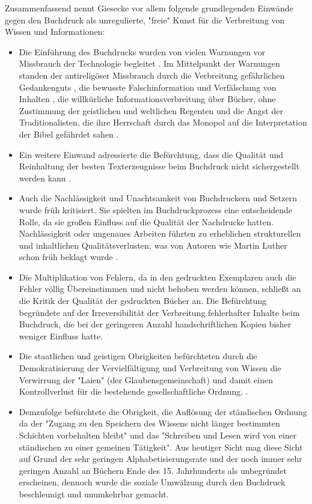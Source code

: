 Zusammenfassend nennt Giesecke vor allem folgende grundlegenden Einwände gegen den Buchdruck als unregulierte, "freie" Kunst \cite{giesecke_1991_buchdruck} für die Verbreitung von Wissen und Informationen:
\begin{itemize}
\item Die Einführung des Buchdrucks wurden von vielen Warnungen vor Missbrauch der Technologie begleitet \cite{lange2008medienwettbewerb}. Im Mittelpunkt der Warnungen standen der antireligöser Missbrauch durch die Verbreitung gefährlichen Gedankenguts \cite{kruse2003multimedia}, die bewusste Falschinformation und Verfälschung von Inhalten \cite{sprachgeschichte_1998_besch}, die willkürliche Informationsverbreitung über Bücher, ohne Zustimmung der geistlichen und weltlichen Regenten \cite{rother_2002_siebenbuergen} und die Angst der Traditionalisten, die ihre Herrschaft durch das Monopol auf die Interpretation der Bibel gefährdet sahen \cite{lange2008medienwettbewerb}.
\item Ein weitere Einwand adressierte die Befürchtung, dass die Qualität und Reinhaltung der besten Texterzeugnisse beim Buchdruck nicht sichergestellt werden kann \cite{giesecke_1991_buchdruck}.
\item Auch die Nachlässigkeit und Unachtsamkeit von Buchdruckern und Setzern wurde früh kritisiert. Sie spielten im Buchdruckprozess eine entscheidende Rolle, da sie großen Einfluss auf die Qualität der Nachdrucke hatten. Nachlässigkeit oder ungenaues Arbeiten führten zu erheblichen strukturellen und inhaltlichen Qualitätsverlusten, was von Autoren wie Martin Luther schon früh beklagt wurde \cite{sprachgeschichte_1998_besch}.
\item Die Multiplikation von Fehlern, da in den gedruckten Exemplaren auch die Fehler völlig Übereinstimmen und nicht behoben werden können, schließt an die Kritik der Qualität der gedruckten Bücher an. Die Befürchtung begründete auf der Irreversibilität der Verbreitung fehlerhafter Inhalte beim Buchdruck, die bei der geringeren Anzahl handschriftlichen Kopien bisher weniger Einfluss hatte.
\item Die staatlichen und geistigen Obrigkeiten befürchteten durch die Demokratisierung der Vervielfältigung und Verbreitung von Wissen die Verwirrung der "Laien" (der Glaubensgemeinschaft) und damit einen Kontrollverlust für die bestehende gesellschaftliche Ordnung. \cite{giesecke_1991_buchdruck}.
\item Demzufolge befürchtete die Obrigkeit, die Auflösung der ständischen Ordnung da der "Zugang zu den Speichern des Wissens nicht länger bestimmten Schichten vorbehalten bleibt" und das "Schreiben und Lesen wird von einer ständischen zu einer gemeinen Tätigkeit". Aus heutiger Sicht mag diese Sicht auf Grund der sehr geringen Alphabetisierungsrate und der noch immer sehr geringen Anzahl an Büchern Ende des 15. Jahrhunderts als unbegründet erscheinen, dennoch wurde die soziale Umwälzung durch den Buchdruck beschleunigt und unumkehrbar gemacht. \cite{giesecke_1991_buchdruck}

\end{itemize}
